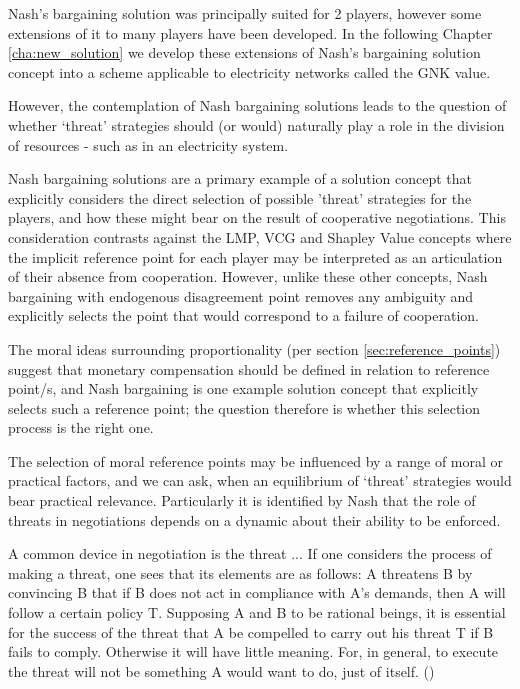 Nash's bargaining solution was principally suited for 2 players, however some extensions of it to many players have been developed.%
In the following Chapter \ref{cha:new_solution} we develop these extensions of Nash's bargaining solution concept into a scheme applicable to electricity networks called the GNK value.

However, the contemplation of Nash bargaining solutions leads to the question of whether `threat' strategies should (or would) naturally play a role in the division of resources - such as in an electricity system.

Nash bargaining solutions are a primary example of a solution concept that explicitly considers the direct selection of possible 'threat' strategies for the players, and how these might bear on the result of cooperative negotiations.
This consideration contrasts against the LMP, VCG and Shapley Value concepts where the implicit reference point for each player may be interpreted as an articulation of their absence from cooperation.
However, unlike these other concepts, Nash bargaining with endogenous disagreement point removes any ambiguity and explicitly selects the point that would correspond to a failure of cooperation.

The moral ideas surrounding proportionality (per section \ref{sec:reference_points}) suggest that monetary compensation should be defined in relation to reference point/s, and Nash bargaining is one example solution concept that explicitly selects such a reference point; the question therefore is whether this selection process is the right one.

The selection of moral reference points may be influenced by a range of moral or practical factors, and we can ask, when an equilibrium of `threat' strategies would bear practical relevance.
Particularly it is identified by Nash that the role of threats in negotiations depends on a dynamic about their ability to be enforced.

\begin{displayquote}
A common device in negotiation is the threat ... If one considers the process of making a threat, one sees that its elements are as follows: A threatens B by convincing B that if B does not act in compliance with A's demands, then A will follow a certain policy T. Supposing A and B to be rational beings, it is essential for the success of the threat that A be compelled to carry out his threat T if B fails to comply. Otherwise it will have little meaning. For, in general, to execute the threat will not be something A would want to do, just of itself.
(\cite{nash2})
\end{displayquote}

